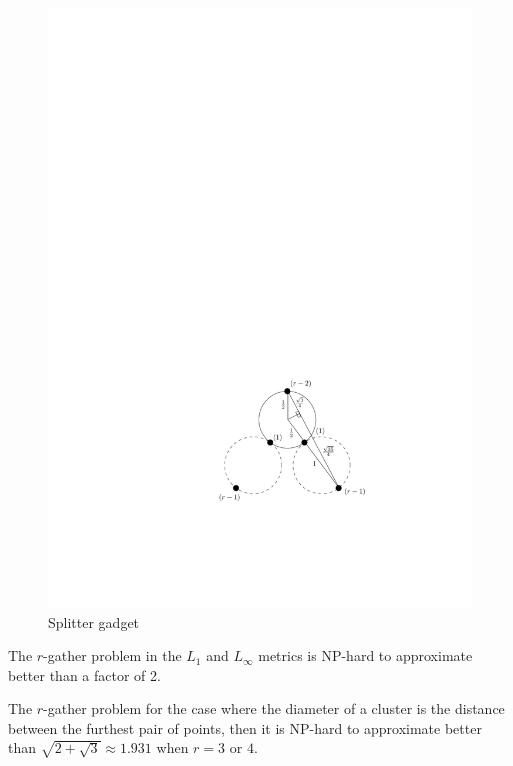 \begin{figure}[htbp]
\begin{center}
\includegraphics[scale=.9]{figs/splitter}
\caption{Splitter gadget}
\label{fig:splitter}
\end{center}
\vspace{-5pt}
\end{figure}

\begin{corollary}\label{cor:hardness5}
The $r$-gather problem in the $L_1$ and $L_\infty$ metrics is NP-hard to approximate better than a factor of 2.
\end{corollary}

\begin{theorem}\label{thm:hardness3}
The $r$-gather problem for the case where the diameter of a cluster is the distance between the furthest pair of points, then it is NP-hard to approximate better than $\sqrt{2+\sqrt{3}} \approx 1.931$ when $r=3$ or $4$.
\end{theorem}

